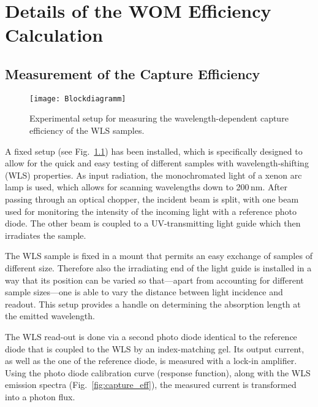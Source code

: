 \chapter{Details of the WOM Efficiency Calculation}
\label{app:wom}

\section*{\label{app:wom_setup}\thesection\enskip
Measurement of the Capture Efficiency}

\begin{figure}[tbp]
  \begin{center}
    \texttt{[image: Blockdiagramm]}
  \end{center}
  \caption[Experimental setup]{Experimental setup for measuring the
   wavelength-dependent capture efficiency of the WLS samples.}
  \label{fig:lab_setup}
\end{figure}

A fixed setup (see Fig.~\ref{fig:lab_setup}) has been installed, which is
specifically designed to allow for the quick and easy testing of different
samples with wavelength-shifting (WLS) properties. As input radiation, the
monochromated light of a xenon arc lamp is used, which allows for scanning
wavelengths down to 200\,nm. After passing through an optical chopper, the
incident beam is split, with one beam used for monitoring the intensity of the
incoming light with a reference photo diode. The other beam is coupled to a
UV-transmitting light guide which then irradiates the sample.

The WLS sample is fixed in a mount that permits an easy exchange of samples of
different size. Therefore also the irradiating end of the light guide is
installed in a way that its position can be varied so that---apart from
accounting for different sample sizes---one is able to vary the distance between
light incidence and readout. This setup provides a handle on determining the
absorption length at the emitted wavelength.

The WLS read-out is done via a second photo diode identical to the reference
diode that is coupled to the WLS by an index-matching gel. Its output current,
as well as the one of the reference diode, is measured with a lock-in
amplifier. Using the photo diode calibration curve (response function),
along with the WLS emission spectra (Fig.~\ref{fig:capture_eff}),
the measured current is transformed into a photon flux.

